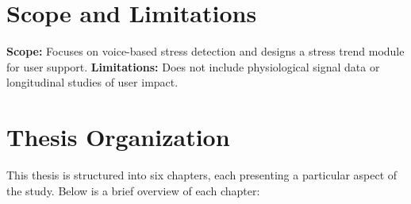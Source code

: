 \documentclass[Arial,12pt,openright,twoside]{book}
\begin{document}
  \section{Scope and Limitations}
 \textbf{Scope:}
 Focuses on voice-based stress detection and designs a stress trend module for user support.
 \textbf{Limitations:}
Does not include physiological signal data or longitudinal studies of user impact.
\section{Thesis Organization}
This thesis is structured into six chapters, each presenting a particular aspect of the study. Below is a brief overview of each chapter:
\end{document}
